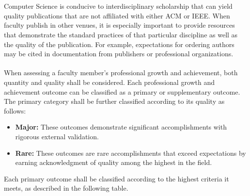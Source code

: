 \documentclass{scrartcl}
\begin{document}
\\\\
Computer Science is conducive to interdisciplinary scholarship that can yield quality publications that are not affiliated with either ACM or IEEE. When faculty publish in other venues, it is especially important to provide resources that demonstrate the standard practices of that particular discipline as well as the quality of the publication. For example, expectations for ordering authors may be cited in documentation from publishers or professional organizations.
\\\\
When assessing a faculty member’s professional growth and achievement, both quantity and quality shall be considered. Each professional growth and achievement outcome can be classified as a primary or supplementary outcome. The primary category shall be further classified according to its quality as follows:
\begin{itemize}
\item \textbf{Major:} These outcomes demonstrate significant accomplishments with rigorous external validation.
\item \textbf{Rare:} These outcomes are rare accomplishments that exceed expectations by earning acknowledgment of quality among the highest in the field.
\end{itemize}
Each primary outcome shall be classified according to the highest criteria it meets, as described in the following table.
\end{document}
